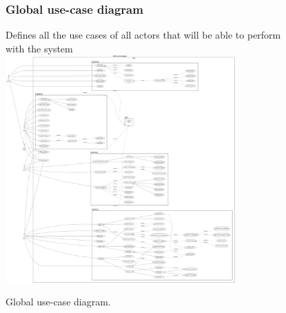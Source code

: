 \documentclass[]{uc2pfecaneva}
\begin{document}
    \begin{figure}
        \subsubsection{Global use-case diagram}
        \centering
        Defines all the use cases of all actors that will be able to perform with the system
        \linebreak
        \includegraphics[width=250pt]{images/GUCD}
        \caption{Global use-case diagram.}
    \end{figure}
    \clearpage
\end{document}

